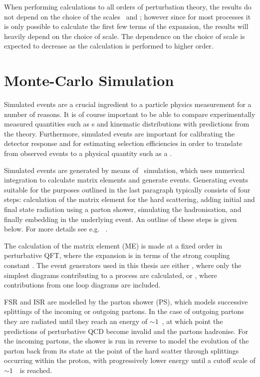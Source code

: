 When performing calculations to all orders of perturbation theory, the results
do not depend on the choice of the scales \uR\ and \uF; however since for most
processes it is only possible to calculate the first few terms of the
expansion, the results will heavily depend on
the choice of scale. The dependence on the choice of scale is expected to
decrease as the calculation is performed to higher order.

\section{Monte-Carlo Simulation}

\label{sec:Theory-MC}

Simulated events are a crucial ingredient to a particle physics
measurement for a number of reasons. It is of course important to be able to
compare experimentally measured quantities such as \cx s and kinematic
distributions with predictions from the theory. Furthermore, simulated events
are important for calibrating the detector response and for estimating
selection efficiencies in order to translate from observed events
to a physical quantity such as a \cx. 

Simulated events are generated by
means of \mc\ simulation, which uses numerical integration to calculate matrix
elements and generate events. Generating events suitable for the purposes
outlined in the last paragraph typically consists of four steps:
calculation of the matrix element for the hard scattering, adding initial and
final state radiation using a parton shower,
simulating the hadronisation, and finally embedding in the underlying event. An
outline of these steps is given below. For more details see e.g.
~\cite{Sjostrand:2006su,Campbell:2006wx}.

The calculation of the matrix element (ME) is
made at a fixed order in perturbative QFT, where the expansion is in terms of
the strong coupling constant \alphaS. The event generators used in this thesis
are either , where only the simplest diagrams
contributing to a process are calculated, or ,
where contributions from one loop diagrams are included. 

FSR and ISR are
modelled by the parton shower (PS), which models successive splittings of the
incoming or outgoing partons. In the case of outgoing partons they are radiated
until they reach an energy of $\sim1$~\gev, at
which point the predictions of perturbative QCD become invalid and the partons
hadronise. For the incoming partons, the
shower is run in reverse to model the evolution of the parton back from its state
at the point of the hard scatter through splittings occurring within the proton,
with progressively lower energy until a cutoff scale of $\sim1$~\gev\ is reached.


